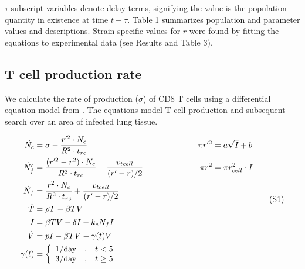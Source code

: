 \documentclass[10pt]{article}
\begin{document}
$\tau$ subscript variables denote delay terms, signifying the value is the population quantity in existence at time $t - \tau$.  Table 1 summarizes population and parameter values and descriptions.  Strain-specific values for $r$ were found by fitting the equations to experimental data (see Results and Table 3).


\subsection{T cell production rate}

We calculate the rate of production ($\sigma$) of CD8 T cells using a differential equation model from \cite{Miao2010}.  The equations model T cell production and subsequent search over an area of infected lung tissue.

{\footnotesize
\begin{equation*}
\label{EqS1}
\begin{aligned}
\dot{N_{c}} &= \sigma - \frac{r'^{2} \cdot N_{c}}{R^{2} \cdot t_{rc}} & \pi r'^{2} &= a \sqrt{I} + b \\
\dot{N'_{f}} &= \frac{(r'^{2} - r^{2}) \cdot N_{c}}{R^{2} \cdot t_{rc}} - \frac{v_{tcell}}{(r' - r) / 2} \hspace*{2cm}  & \pi r^{2} &= \pi r_{cell}^{2} \cdot I \\
\dot{N_{f}} &= \frac{r^{2} \cdot N_{c}}{R^{2} \cdot t_{rc}} + \frac{v_{tcell}}{(r' - r) / 2} \\
\dot{T} &= \rho T -\beta TV \\
\dot{I} &= \beta TV - \delta I - k_{e} N_{f} I \\
\dot{V} &= pI - \beta TV - \gamma (t) V \\
\gamma (t) &= \left\{ \begin{array}{rcl}
	1/\mbox{day} & \mbox{,}  & t < 5  \\
	3/\mbox{day} & \mbox{,} & t \geq 5  
	\end{array}\right. \\
\end{aligned}
\tag{S1}
\end{equation*}
}
\vspace{.05in}
\end{document}
